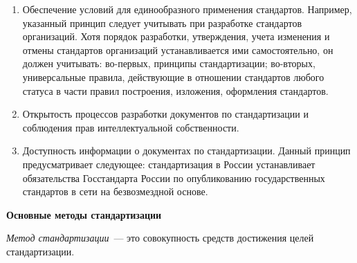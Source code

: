 \begin{enumerate}
\item Обеспечение условий для единообразного применения стандартов. Например, указанный принцип следует учитывать при разработке стандартов организаций. Хотя порядок разработки, утверждения, учета изменения и отмены стандартов организаций устанавливается ими самостоятельно, он должен учитывать: во-первых, принципы стандартизации; во-вторых, универсальные правила, действующие в отношении стандартов любого статуса в части правил построения, изложения, оформления стандартов.
\item Открытость процессов разработки документов по стандартизации и соблюдения прав интеллектуальной собственности.
\item Доступность информации о документах по стандартизации. Данный принцип предусматривает следующее: стандартизация в России устанавливает обязательства Госстандарта России по опубликованию государственных стандартов в сети на безвозмездной основе.
\end{enumerate}

\begin{flushleft}
\textbf{Основные методы стандартизации}
\end{flushleft}

\textit{Метод стандартизации}~--- это совокупность средств достижения целей стандартизации.

